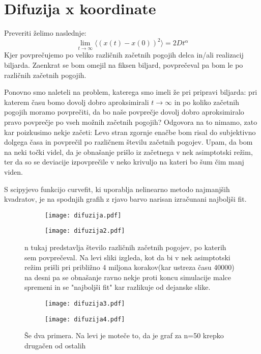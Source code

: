 \documentclass{article}
\begin{document}
\section{Difuzija x koordinate}


Preveriti želimo naslednje:
\begin{equation*}
\lim_{t \to \infty} \langle (x(t)-x(0))^2 \rangle = 2D t^\alpha
\end{equation*}
Kjer povprečujemo po veliko različnih začetnih pogojih delca in/ali realizacij biljarda. Zaenkrat se bom omejil na fiksen biljard, povprečeval pa bom le po različnih začetnih pogojih.

Ponovno smo naleteli na problem, katerega smo imeli že pri pripravi biljarda: pri katerem času bomo dovolj dobro aproksimirali $t \to \infty$ in po koliko začetnih pogojih moramo povprečiti, da bo naše povprečje dovolj dobro aproksimiralo pravo povprečje po vseh možnih začetnih pogojih?
Odgovora na to nimamo, zato kar poizkusimo nekje začeti: Levo stran zgornje enačbe bom risal do subjektivno dolgega časa in povprečil po različnem številu začetnih pogojev. Upam, da bom na neki točki videl, da je obnašanje prišlo iz začetnega v nek asimptotski režim, ter da so se deviacije izpovprečile v neko krivuljo na kateri bo šum čim manj viden.

S scipyjevo funkcijo curvefit, ki uporablja nelinearno metodo najmanjših kvadratov, je na spodnjih grafih z rjavo barvo narisan izračunani najboljši fit.

\begin{figure}[H]
\centering
\begin{subfigure}{.49\textwidth}
\texttt{[image: difuzija.pdf]}
\end{subfigure}
\begin{subfigure}{.49\textwidth}
\texttt{[image: difuzija2.pdf]}
\end{subfigure}
\caption*{n tukaj predstavlja število različnih začetnih pogojev, po katerih sem povprečeval. Na levi sliki izgleda, kot da bi v nek asimptotski režim prišli pri približno 4 miljona korakov(kar ustreza času 40000) na desni pa se obnašanje ravno nekje proti koncu  simulacije malce spremeni in se "najboljši fit" kar razlikuje od dejanske slike. }
\end{figure}



\begin{figure}[H]
\centering
\begin{subfigure}{.49\textwidth}
\texttt{[image: difuzija3.pdf]}
\end{subfigure}
\begin{subfigure}{.49\textwidth}
\texttt{[image: difuzija4.pdf]}
\end{subfigure}
\caption*{Še dva primera. Na levi je moteče to, da je graf za n=50 krepko drugačen od ostalih}
\end{figure}
\end{document}
